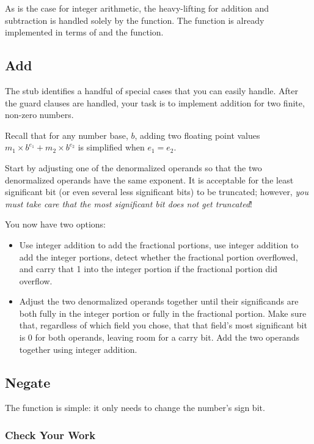 As is the case for integer arithmetic, the heavy-lifting for addition and subtraction is handled solely by the  function.
The  function is already implemented in terms of  and the  function.

\subsection{Add}

The  stub identifies a handful of special cases that you can easily handle.
After the guard clauses are handled, your task is to implement addition for two finite, non-zero numbers.

Recall that for any number base, $b$, adding two floating point values $m_1 \times b^{e_1} + m_2 \times b^{e_2}$ is simplified when $e_1 = e_2$.

Start by adjusting one of the denormalized operands so that the two denormalized operands have the same exponent.
It is acceptable for the least significant bit (or even several less significant bits) to be truncated;
however, \textit{you must take care that the most significant bit does not get truncated}!

You now have two options:
\begin{itemize}
    \item Use integer addition to add the fractional portions, use integer addition to add the integer portions, detect whether the fractional portion overflowed, and carry that 1 into the integer portion if the fractional portion did overflow.
    \item Adjust the two denormalized operands together until their significands are both fully in the integer portion or fully in the fractional portion.
        Make sure that, regardless of which field you chose, that that field's most significant bit is 0 for both operands, leaving room for a carry bit.
        Add the two operands together using integer addition.
\end{itemize}

\subsection{Negate}

The  function is simple: it only needs to change the number's sign bit.

\subsubsection*{Check Your Work}

